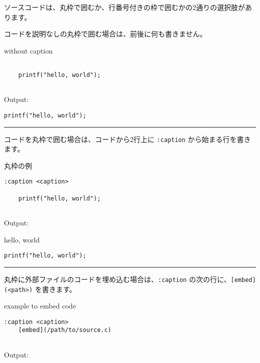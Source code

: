\documentclass[a4j, titlepage]{jarticle}
\begin{document}
ソースコードは、丸枠で囲むか、行番号付きの枠で囲むかの2通りの選択肢があります。

コードを説明なしの丸枠で囲む場合は、前後に何も書きません。

\begin{itembox}[c]{without caption}
\begin{verbatim}
　
    printf("hello, world");
　
\end{verbatim}
\end{itembox}

Output:

\begin{screen}
\begin{verbatim}
printf("hello, world");
\end{verbatim}
\end{screen}

\begin{center}
\rule{3in}{0.4pt}
\end{center}

コードを丸枠で囲む場合は、コードから2行上に {\tt :caption} から始まる行を書きます。

\begin{itembox}[c]{丸枠の例}
\begin{verbatim}
:caption <caption>

    printf("hello, world");
　
\end{verbatim}
\end{itembox}

Output:

\begin{itembox}[c]{hello, world}
\begin{verbatim}
printf("hello, world");
\end{verbatim}
\end{itembox}

\begin{center}
\rule{3in}{0.4pt}
\end{center}

丸枠に外部ファイルのコードを埋め込む場合は、{\tt :caption} の次の行に、{\tt [embed](\textless{}path\textgreater{})} を書きます。

\begin{itembox}[c]{example to embed code}
\begin{verbatim}
:caption <caption>
    [embed](/path/to/source.c)
　
\end{verbatim}
\end{itembox}

Output:
\end{document}
